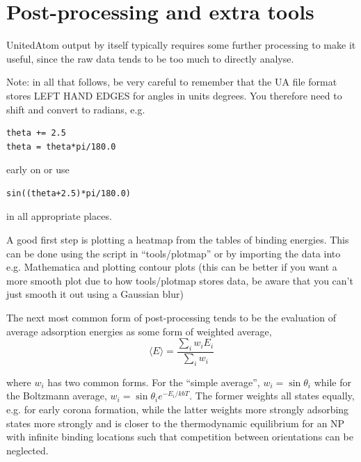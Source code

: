 \documentclass[10pt,a4paper,onecolumn]{report}
\begin{document}
\section{Post-processing and extra tools}
UnitedAtom output by itself typically requires some further processing to make it useful, since the raw data tends to be too much to directly analyse.

Note: in all that follows, be very careful to remember that the UA file format stores LEFT HAND EDGES for angles in units degrees. You therefore need to shift and convert to radians, e.g.
\begin{lstlisting}
theta += 2.5
theta = theta*pi/180.0
\end{lstlisting}
early on or use
\begin{lstlisting}
sin((theta+2.5)*pi/180.0)
\end{lstlisting}
in all appropriate places.

A good first step is plotting a heatmap from the tables of binding energies. This can be done using the script in ``tools/plotmap'' or by importing the data into e.g. Mathematica and plotting contour plots (this can be better if you want a more smooth plot due to how tools/plotmap stores data, be aware that you can't just smooth it out using a Gaussian blur)

The next most common form of post-processing tends to be the evaluation of average adsorption energies as some form of weighted average,
\begin{equation}
\langle E \rangle = \frac{ \sum_i w_i E_i}{\sum_i w_i}
\end{equation}

where $w_i$ has two common forms. For the ``simple average'', $w_i = \sin \theta_i$ while for the Boltzmann average, $w_i = \sin \theta_i e^{-E_i/kbT}$. The former weights all states equally, e.g. for early corona formation, while the latter weights more strongly adsorbing states more strongly and is closer to the thermodynamic equilibrium for an NP with infinite binding locations such that competition between orientations can be neglected. 
\end{document}
